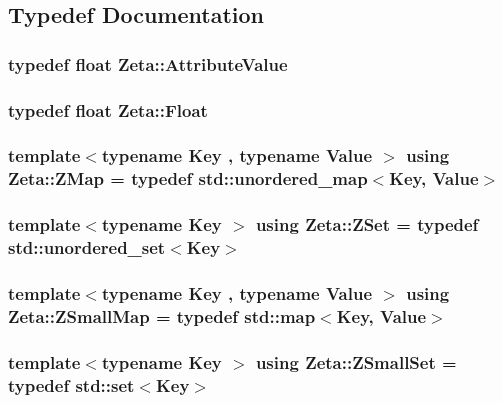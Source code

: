 \subsection{Typedef Documentation}
\hypertarget{namespaceZeta_ab5947f98c0ab6302b51f8c6e93ec5581}{
\subsubsection[{Attribute\+Value}]{\setlength{\rightskip}{0pt plus 5cm}typedef float {\bf Zeta\+::\+Attribute\+Value}}}\label{namespaceZeta_ab5947f98c0ab6302b51f8c6e93ec5581}
\hypertarget{namespaceZeta_a1e0a1265f9b3bd3075fb0fabd39088ba}{
\subsubsection[{Float}]{\setlength{\rightskip}{0pt plus 5cm}typedef float {\bf Zeta\+::\+Float}}}\label{namespaceZeta_a1e0a1265f9b3bd3075fb0fabd39088ba}
\hypertarget{namespaceZeta_a9af2e12c4e432d2a1725f19e5a648a04}{
\subsubsection[{Z\+Map}]{\setlength{\rightskip}{0pt plus 5cm}template$<$typename Key , typename Value $>$ using {\bf Zeta\+::\+Z\+Map} = typedef std\+::unordered\+\_\+map$<$Key, Value$>$}}\label{namespaceZeta_a9af2e12c4e432d2a1725f19e5a648a04}
\hypertarget{namespaceZeta_a92c229b4db6ab7275c2b7f32bdfabc87}{
\subsubsection[{Z\+Set}]{\setlength{\rightskip}{0pt plus 5cm}template$<$typename Key $>$ using {\bf Zeta\+::\+Z\+Set} = typedef std\+::unordered\+\_\+set$<$Key$>$}}\label{namespaceZeta_a92c229b4db6ab7275c2b7f32bdfabc87}
\hypertarget{namespaceZeta_a4c11e23ddc559dccdb5e85901d7dfb84}{
\subsubsection[{Z\+Small\+Map}]{\setlength{\rightskip}{0pt plus 5cm}template$<$typename Key , typename Value $>$ using {\bf Zeta\+::\+Z\+Small\+Map} = typedef std\+::map$<$Key, Value$>$}}\label{namespaceZeta_a4c11e23ddc559dccdb5e85901d7dfb84}
\hypertarget{namespaceZeta_a44c717c98a964d0ebf6ea954cb9c91bf}{
\subsubsection[{Z\+Small\+Set}]{\setlength{\rightskip}{0pt plus 5cm}template$<$typename Key $>$ using {\bf Zeta\+::\+Z\+Small\+Set} = typedef std\+::set$<$Key$>$}}\label{namespaceZeta_a44c717c98a964d0ebf6ea954cb9c91bf}


